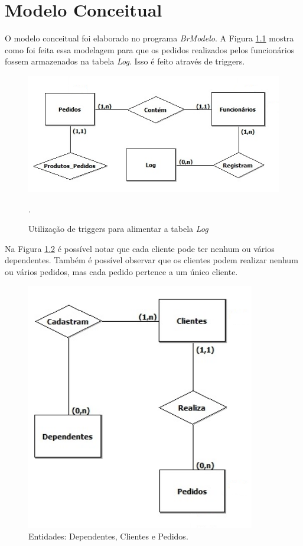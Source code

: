 \documentclass[
	12pt,				%
	openright,			%
	oneside,			%
	a4paper,			%
	chapter=TITLE,		%
	section=TITLE,		%
	english,			%
	brazil				%
	]{abntex2}
\begin{document}
\chapter{Modelo Conceitual}
    O modelo conceitual foi elaborado no programa \textit{BrModelo}. A Figura \ref{mc01} 
    mostra como foi feita essa modelagem para que os pedidos realizados pelos funcionários fossem 
    armazenados na tabela \textit{Log}. Isso é feito através de triggers.
    
    \begin{figure}[h]
         \centering
         \includegraphics[width=15cm,keepaspectratio]{Imgs/MC_01}
         \caption{Utilização de triggers para alimentar a tabela \textit{Log}}.
         \label{mc01}
    \end{figure}    

    \newpage
    
    Na Figura \ref{mc_02} é possível notar que cada cliente pode ter
    nenhum ou vários dependentes. Também é possível observar que os clientes podem 
    realizar nenhum ou vários pedidos, mas cada pedido pertence a um único cliente.
    \begin{figure}[h]
         \centering
         \includegraphics[width=10cm,keepaspectratio]{Imgs/MC_02}
         \caption{Entidades: Dependentes, Clientes e Pedidos.}
         \label{mc_02}
    \end{figure}
\end{document}
